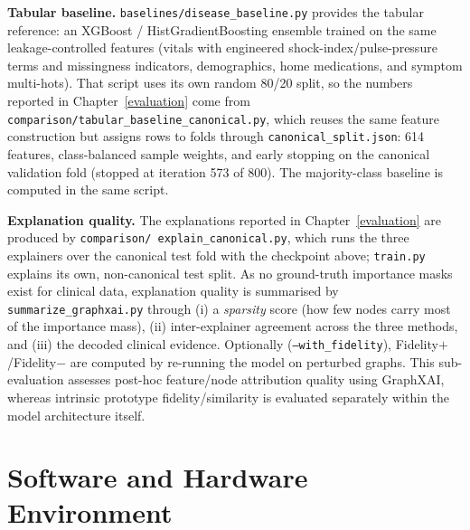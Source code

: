 \textbf{Tabular baseline.} \texttt{baselines/disease\_baseline.py} provides the
tabular reference: an XGBoost / HistGradientBoosting ensemble trained on the
same leakage-controlled features (vitals with engineered
shock-index/pulse-pressure terms and missingness indicators, demographics, home
medications, and symptom multi-hots). That script uses its own random 80/20
split, so the numbers reported in Chapter~\ref{evaluation} come from
\texttt{comparison/\allowbreak tabular\_baseline\_canonical.py}, which reuses the same
feature construction but assigns rows to folds through
\texttt{canonical\_split.json}: 614 features, class-balanced sample weights, and
early stopping on the canonical validation fold (stopped at iteration 573 of
800). The majority-class baseline is computed in the same script.

\textbf{Explanation quality.} The explanations reported in
Chapter~\ref{evaluation} are produced by \texttt{comparison/\allowbreak
explain\_canonical.py}, which runs the three explainers over the canonical test
fold with the checkpoint above; \texttt{train.py} explains its own,
non-canonical test split. As no ground-truth importance masks exist for clinical
data, explanation quality is summarised by \texttt{summarize\_graphxai.py}
through (i) a \emph{sparsity} score (how few
nodes carry most of the importance mass), (ii) inter-explainer agreement across
the three methods, and (iii) the decoded clinical evidence. Optionally
(\texttt{--with\_fidelity}), Fidelity$+$/Fidelity$-$ are computed by re-running
the model on perturbed graphs. This sub-evaluation assesses post-hoc feature/node attribution quality using GraphXAI, whereas intrinsic prototype fidelity/similarity is evaluated separately within the model architecture itself.


\section{Software and Hardware Environment}

